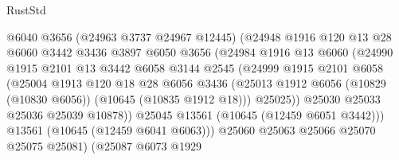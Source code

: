 \begin{lexlean}{RustStd}
\begin{coremodule}
                              @6040
                              @3656
                              (@24963 @3737 @24967 @12445)
                              (@24948
                                @1916
                                @120
                                @13
                                @28
                                @6060
                                @3442
                                @3436
                                @3897
                                @6050
                                @3656
                                (@24984
                                  @1916
                                  @13
                                  @6060
                                  (@24990
                                    @1915
                                    @2101
                                    @13
                                    @3442
                                    @6058
                                    @3144
                                    @2545
                                    (@24999
                                      @1915
                                      @2101
                                      @6058
                                      (@25004
                                        @1913
                                        @120
                                        @18
                                        @28
                                        @6056
                                        @3436
                                        (@25013
                                          @1912
                                          @6056
                                          (@10829 (@10830 @6056))
                                          (@10645 (@10835 @1912 @18)))
                                        @25025))
                                    @25030
                                    @25033
                                    @25036
                                    @25039
                                    @10878))
                                @25045
                                @13561
                                (@10645 (@12459 @6051 @3442)))
                              @13561
                              (@10645 (@12459 @6041 @6063)))
                            @25060
                            @25063
                            @25066
                            @25070
                            @25075
                            @25081)
                          (@25087
                            @6073
                            @1929

\end{coremodule}
\end{lexlean}

